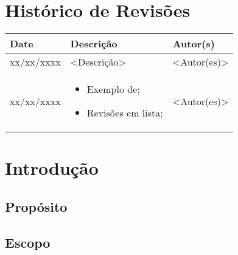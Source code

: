 \documentclass{article}
\begin{document}

\capa\newpage

\section*{\center Histórico de Revisões}
  \vspace*{1cm}
  \begin{table}[ht]
    \centering
    \begin{tabular}[pos]{|m{2cm} | m{7.2cm} | m{3.8cm}|} 
      \hline
      \cellcolor[gray]{0.9}
      \textbf{Date} & \cellcolor[gray]{0.9}\textbf{Descrição} & \cellcolor[gray]{0.9}\textbf{Autor(s)}\\ \hline
      \hline
      \small xx/xx/xxxx & \small <Descrição> & \small <Autor(es)> \\ \hline      
      \small xx/xx/xxxx &
      \begin{small}
        \begin{itemize}
          \item Exemplo de;
          \item Revisões em lista;
        \end{itemize}
      \end{small} & \small <Autor(es)> \\ \hline 
    \end{tabular}
  \end{table}

\newpage

\tableofcontents
\newpage

\section{Introdução}

\subsection{Propósito}

\subsection{Escopo}
    
\end{document}

